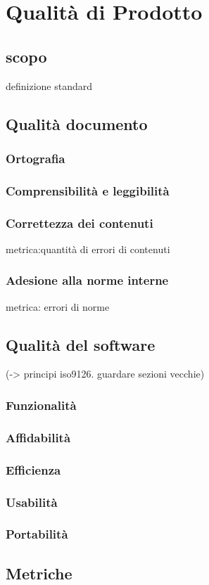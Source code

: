 \chapter{Qualità di Prodotto}
\label{prodotto}
\section{scopo}
definizione standard

\section{Qualità documento}

\subsection{Ortografia}

\subsection{Comprensibilità e leggibilità}

\subsection{Correttezza dei contenuti}
metrica:quantità di errori di contenuti

\subsection{Adesione alla norme interne}
metrica: errori di norme

\section{Qualità del software}
(-> principi iso9126. guardare sezioni vecchie) 

\subsection{Funzionalità}

\subsection{Affidabilità}

\subsection{Efficienza}

\subsection{Usabilità}

\subsection{Portabilità}

\section{Metriche}